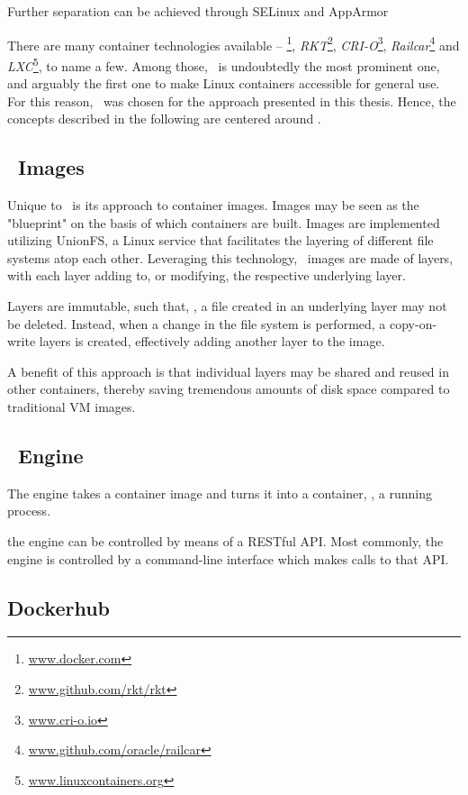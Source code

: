 Further separation can be achieved through SELinux and AppArmor

There are many container technologies available -- \emph{\docker}\footnote{\url{www.docker.com}}, \emph{RKT}\footnote{\url{www.github.com/rkt/rkt}}, \emph{CRI-O}\footnote{\url{www.cri-o.io}}, \emph{Railcar}\footnote{\url{www.github.com/oracle/railcar}} and \emph{LXC}\footnote{\url{www.linuxcontainers.org}}, to name a few. Among those,  \docker\ is undoubtedly the most prominent one, and arguably the first one to make Linux containers accessible for general use. For this reason, \docker\ was chosen for the approach presented in this thesis. Hence, the concepts described in the following are centered around \docker . 

\subsection{\docker\ Images}
Unique to \docker\ is its approach to container images. Images may be seen as the "blueprint" on the basis of which containers are built. Images are implemented utilizing UnionFS, a Linux service that facilitates the layering of different file systems atop each other. 
Leveraging this technology, \docker\ images are made of layers, with each layer adding to, or modifying, the respective underlying layer. 

Layers are immutable, such that, \eg , a file created in an underlying layer may not be deleted. Instead, when a change in the file system is performed, a copy-on-write layers is created, effectively adding another layer to the image.

A benefit of this approach is that individual layers may be shared and reused in other containers, thereby saving tremendous amounts of disk space compared to traditional VM images.

\subsection{\docker\ Engine}
The engine takes a container image and turns it into a container, \ie , a running process.

the engine can be controlled by means of a RESTful API. Most commonly, the engine is controlled by a command-line interface which makes calls to that API.

\subsection{Dockerhub}


